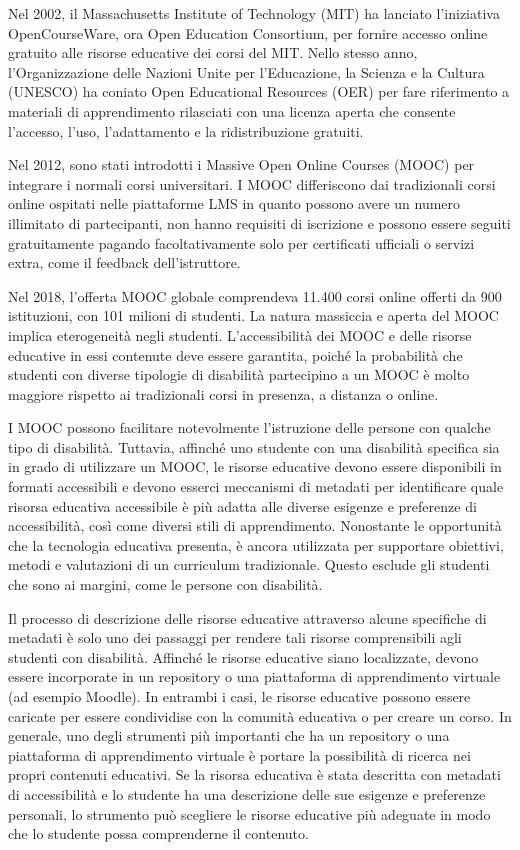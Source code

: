 Nel 2002, il Massachusetts Institute of Technology (MIT) ha lanciato l'iniziativa OpenCourseWare, ora Open Education Consortium, per fornire accesso online gratuito alle risorse educative dei corsi del MIT. Nello stesso anno, l'Organizzazione delle Nazioni Unite per l'Educazione, la Scienza e la Cultura (UNESCO) ha coniato Open Educational Resources (OER) per fare riferimento a materiali di apprendimento rilasciati con una licenza aperta che consente l'accesso, l'uso, l'adattamento e la ridistribuzione gratuiti.

Nel 2012, sono stati introdotti i Massive Open Online Courses (MOOC) per integrare i normali corsi universitari. I MOOC differiscono dai tradizionali corsi online ospitati nelle piattaforme LMS in quanto possono avere un numero illimitato di partecipanti, non hanno requisiti di iscrizione e possono essere seguiti gratuitamente pagando facoltativamente solo per certificati ufficiali o servizi extra, come il feedback dell'istruttore.

Nel 2018, l'offerta MOOC globale comprendeva 11.400 corsi online offerti da 900 istituzioni, con 101 milioni di studenti. La natura massiccia e aperta del MOOC implica eterogeneità negli studenti. L'accessibilità dei MOOC e delle risorse educative in essi contenute deve essere garantita, poiché la probabilità che studenti con diverse tipologie di disabilità partecipino a un MOOC è molto maggiore rispetto ai tradizionali corsi in presenza, a distanza o online. 

I MOOC possono facilitare notevolmente l'istruzione delle persone con qualche tipo di disabilità. Tuttavia, affinché uno studente con una disabilità specifica sia in grado di utilizzare un MOOC, le risorse educative devono essere disponibili in formati accessibili e devono esserci meccanismi di metadati per identificare quale risorsa educativa accessibile è più adatta alle diverse esigenze e preferenze di accessibilità, così come diversi stili di apprendimento. Nonostante le opportunità che la tecnologia educativa presenta, è ancora utilizzata per supportare obiettivi, metodi e valutazioni di un curriculum tradizionale. Questo esclude gli studenti che sono ai margini, come le persone con disabilità.

Il processo di descrizione delle risorse educative attraverso alcune specifiche di metadati è solo uno dei passaggi per rendere tali risorse comprensibili agli studenti con disabilità. Affinché le risorse educative siano localizzate, devono essere incorporate in un repository o una piattaforma di apprendimento virtuale (ad esempio Moodle). In entrambi i casi, le risorse educative possono essere caricate per essere condividise con la comunità educativa o per creare un corso. In generale, uno degli strumenti più importanti che ha un repository o una piattaforma di apprendimento virtuale è portare la possibilità di ricerca nei propri contenuti educativi. Se la risorsa educativa è stata descritta con metadati di accessibilità e lo studente ha una descrizione delle sue esigenze e preferenze personali, lo strumento può scegliere le risorse educative più adeguate in modo che lo studente possa comprenderne il contenuto.

